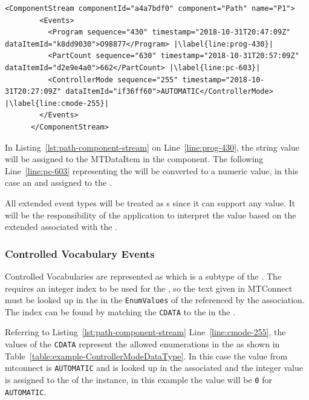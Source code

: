 \begin{lstlisting}[firstnumber=last,escapechar=|,%
    caption={Path Component Stream},label={lst:path-component-stream}]
      <ComponentStream componentId="a4a7bdf0" component="Path" name="P1">
        <Events>
          <Program sequence="430" timestamp="2018-10-31T20:47:09Z" dataItemId="k8dd9030">O98877</Program> |\label{line:prog-430}|
          <PartCount sequence="630" timestamp="2018-10-31T20:57:09Z" dataItemId="d2e9e4a0">662</PartCount> |\label{line:pc-603}|
          <ControllerMode sequence="255" timestamp="2018-10-31T20:27:09Z" dataItemId="if36ff60">AUTOMATIC</ControllerMode> |\label{line:cmode-255}|
        </Events>
      </ComponentStream>
\end{lstlisting}

In Listing~\ref{lst:path-component-stream} on Line~\ref{line:prog-430}, the string value will be assigned to the  \gls{MTDataItem} in the  component. The following Line~\ref{line:pc-603} representing the  will be converted to a numeric value, in this case an  and assigned to the .

All extended event types will be treated as s since it can support any value. It will be the responsibility of the application to interpret the value based on the extended  associated with the .

\subsubsection{Controlled Vocabulary Events}

Controlled Vocabularies are represented as  which is a subtype of the . The  requires an integer index to be used for the , so the text given in MTConnect must be looked up in the  in the \texttt{EnumValues}  of the  referenced by the  association. The index can be found by matching the \texttt{CDATA} to the  in the .

Referring to Listing~\ref{lst:path-component-stream} Line~\ref{line:cmode-255}, the values of the \texttt{CDATA} represent the allowed enumerations in the  as shown in Table~\ref{table:example-ControllerModeDataType}. In this case the value from mtconnect is \texttt{AUTOMATIC} and is looked up in the associated  and the integer value is assigned to the  of the  instance, in this example the value will be \texttt{0} for \texttt{AUTOMATIC}.

